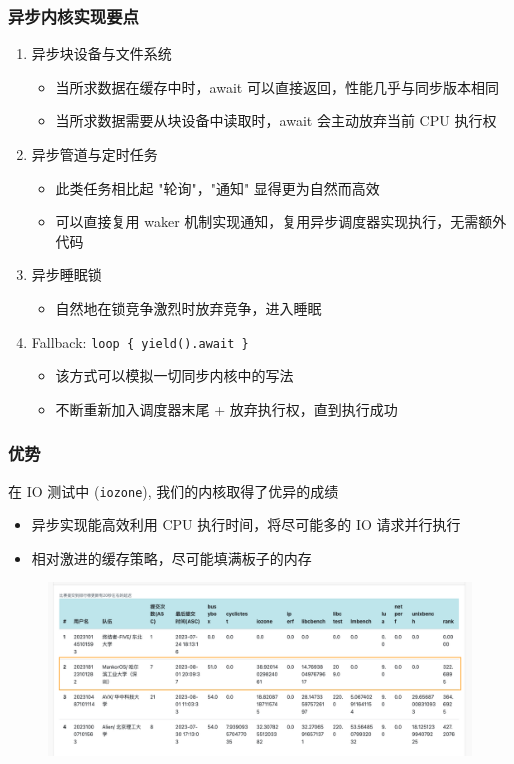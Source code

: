 \begin{frame}
    \frametitle{异步内核实现要点}

    \begin{enumerate}
        \item 异步块设备与文件系统
              \begin{itemize}
                  \item 当所求数据在缓存中时，await 可以直接返回，性能几乎与同步版本相同
                  \item 当所求数据需要从块设备中读取时，await 会主动放弃当前 CPU 执行权
              \end{itemize}
        \item 异步管道与定时任务
              \begin{itemize}
                  \item 此类任务相比起 "轮询"，"通知" 显得更为自然而高效
                  \item 可以直接复用 waker 机制实现通知，复用异步调度器实现执行，无需额外代码
              \end{itemize}
        \item 异步睡眠锁
              \begin{itemize}
                  \item 自然地在锁竞争激烈时放弃竞争，进入睡眠
              \end{itemize}
        \item Fallback: \texttt{loop \{ yield().await \}}
              \begin{itemize}
                  \item 该方式可以模拟一切同步内核中的写法
                  \item 不断重新加入调度器末尾 + 放弃执行权，直到执行成功
              \end{itemize}
    \end{enumerate}
\end{frame}

\begin{frame}
    \frametitle{优势}

    在 IO 测试中 (\texttt{iozone}), 我们的内核取得了优异的成绩
    \begin{itemize}
        \item 异步实现能高效利用 CPU 执行时间，将尽可能多的 IO 请求并行执行
        \item 相对激进的缓存策略，尽可能填满板子的内存
    \end{itemize}

    \begin{figure}
        \includegraphics[width=.75\textwidth]{assets/leaderboard-final1.png}
    \end{figure}
\end{frame}

